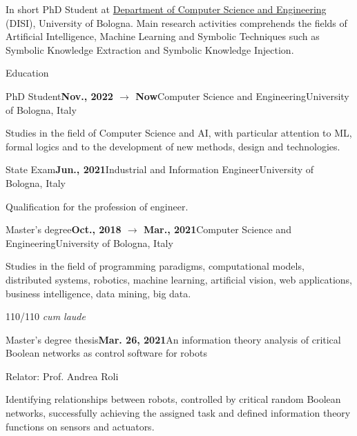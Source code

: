 \documentclass{resume} %
\begin{document}
    
    \begin{rSection}{In short}
        PhD Student at \href{https://disi.unibo.it/it}{Department of Computer Science and Engineering} (DISI), University of Bologna.
        Main research activities comprehends the fields of Artificial Intelligence, Machine Learning and Symbolic Techniques such as Symbolic Knowledge Extraction and Symbolic Knowledge Injection.
        
    \end{rSection}
    
    
    \begin{rSection}{Education}
        
        \begin{rSubsection}{PhD Student}{\textbf{Nov., 2022 $\rightarrow$ Now}}{Computer Science and Engineering}{University of Bologna, Italy}
            \item Studies in the field of Computer Science and AI, with particular attention to ML, formal logics and to the development of new methods, design and technologies.
        \end{rSubsection}
        
        \begin{rSubsection}{State Exam}{\textbf{Jun., 2021}}{Industrial and Information Engineer}{University of Bologna, Italy}
            \item Qualification for the profession of engineer.
        \end{rSubsection}
        
        \begin{rSubsection}{Master's degree}{\textbf{Oct., 2018 $\rightarrow$ Mar., 2021}}{Computer Science and Engineering}{University of Bologna, Italy}
            \item Studies in the field of programming paradigms, computational models, distributed systems, robotics, machine learning, artificial vision, web applications, business intelligence, data mining, big data.
            
            \item 110/110 \emph{cum laude}
        \end{rSubsection}
        \begin{rSubsection}{Master's degree thesis}{\textbf{Mar. 26, 2021}}{An information theory analysis of critical Boolean networks as control software for robots}{\begin{flushright}
                    Relator: Prof. Andrea Roli
            \end{flushright}}
            \item Identifying relationships between robots, controlled by critical random Boolean networks, successfully achieving the assigned task and defined information theory functions on sensors and actuators.
            

\end{rSubsection}
\end{rSection}
\end{document}
